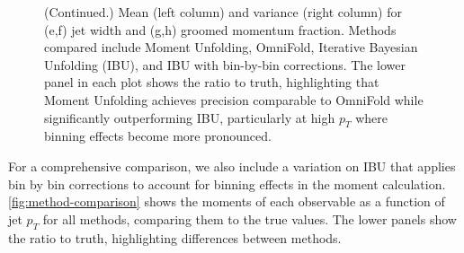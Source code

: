\begin{figure}
    
    \caption[]{(Continued.) Mean (left column) and variance (right column) for (e,f) jet width and (g,h) groomed momentum fraction. Methods compared include Moment Unfolding, OmniFold, Iterative Bayesian Unfolding (IBU), and IBU with bin-by-bin corrections. The lower panel in each plot shows the ratio to truth, highlighting that Moment Unfolding achieves precision comparable to OmniFold while significantly outperforming IBU, particularly at high $p_T$ where binning effects become more pronounced.}
\end{figure}

    For a comprehensive comparison, we also include a variation on IBU that applies bin by bin corrections to account for binning effects in the moment calculation.
    \cref{fig:method-comparison} shows the moments of each observable as a function of jet $p_T$ for all methods, comparing them to the true values.
    The lower panels show the ratio to truth, highlighting differences between methods.

